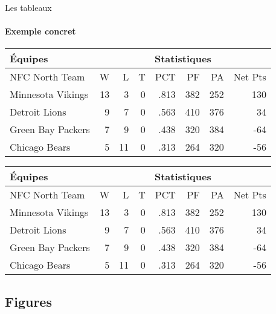 \begin{frame}[fragile,c]{Les tableaux}
	\framesubtitle{Exemple concret}
\begin{codesource}
	\begin{tabularx}{\textwidth}{X|rrr|r|rrr}
		\textbf{\'{E}quipes}	&	\multicolumn{7}{c}{\textbf{Statistiques}} \\
		\hline\hline
		NFC North Team		&	W	&	L	&	T	&	PCT		&	PF	&	PA	&	Net Pts \\
		\hline
		Minnesota Vikings	&	13	&	3	&	0	&	.813	&	382	&	252	&	130 \\
		Detroit Lions		&	9	&	7	&	0	&	.563	&	410	&	376	&	34 \\
		Green Bay Packers	&	7	&	9	& 	0	&	.438	&	320	&	384	&	-64 \\
		Chicago Bears		&	5	&	11	&	0	&	.313	&	264	&	320	&	-56
	\end{tabularx}
\end{codesource}

	\begin{tabularx}{\textwidth}{X|rrr|r|rrr}
		\textbf{Équipes}	&	\multicolumn{7}{c}{\textbf{Statistiques}} \\
		\hline\hline
		NFC North Team		&	W	&	L	&	T	&	PCT		&	PF	&	PA	&	Net Pts \\
		\hline
		Minnesota Vikings	&	13	&	3	&	0	&	.813	&	382	&	252	&	130 \\
		Detroit Lions		&	9	&	7	&	0	&	.563	&	410	&	376	&	34 \\
		Green Bay Packers	&	7	&	9	& 	0	&	.438	&	320	&	384	&	-64 \\
		Chicago Bears		&	5	&	11	&	0	&	.313	&	264	&	320	&	-56
	\end{tabularx}
\end{frame}

\subsection{Figures}